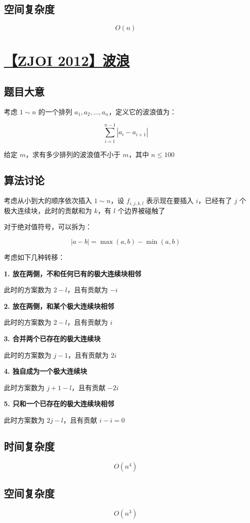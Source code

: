 \documentclass[UTF8]{article}
\begin{document}
\subsection{空间复杂度}

$$
O(n)
$$

\section{\href{https://www.lydsy.com/JudgeOnline/problem.php?id=2817}{【ZJOI 2012】波浪}}

\subsection{题目大意}

考虑 $1 \sim n$ 的一个排列 $a_1,a_2,\dots,a_n$，定义它的波浪值为：

$$
\sum_{i=1}^{n-1} |a_i-a_{i+1}|
$$

给定 $m$，求有多少排列的波浪值不小于 $m$，其中 $n \le 100$

\subsection{算法讨论}

考虑从小到大的顺序依次插入 $1 \sim n$，设 $f_{i,j,k,l}$ 表示现在要插入 $i$，已经有了 $j$ 个极大连续块，此时的贡献和为 $k$，有 $l$ 个边界被碰触了

对于绝对值符号，可以拆为：

$$
|a-b|=\max(a,b)-\min(a,b)
$$

考虑如下几种转移：

\textbf{1. 放在两侧，不和任何已有的极大连续块相邻}

此时的方案数为 $2-l$，且有贡献为 $-i$

\textbf{2. 放在两侧，和某个极大连续块相邻}

此时的方案数为 $2-l$，且有贡献为 $i$

\textbf{3. 合并两个已存在的极大连续块}

此时的方案数为 $j-1$，且有贡献为 $2i$

\textbf{4. 独自成为一个极大连续块}

此时方案数为 $j+1-l$，且有贡献 $-2i$

\textbf{5. 只和一个已存在的极大连续块相邻}

此时方案数为 $2j-l$，且有贡献 $i-i=0$

\subsection{时间复杂度}

$$
O(n^4)
$$

\subsection{空间复杂度}

$$
O(n^3)
$$
\end{document}
